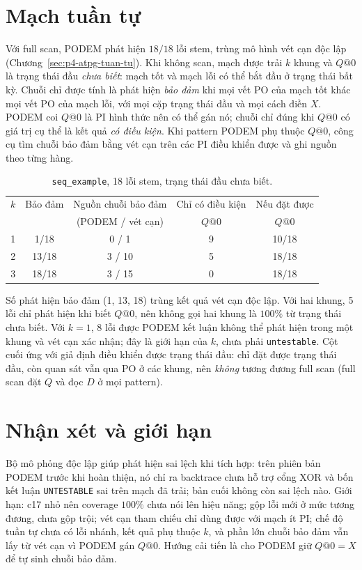 \section{Mạch tuần tự}
\label{sec:p6-tuan-tu}
Với full scan, PODEM phát hiện $18/18$ lỗi stem, trùng mô hình vét cạn độc
lập (Chương~\ref{sec:p4-atpg-tuan-tu}). Khi không scan, mạch được trải $k$ khung và
$Q@0$ là trạng thái đầu \emph{chưa biết}: mạch tốt và mạch lỗi có thể bắt đầu ở
trạng thái bất kỳ. Chuỗi chỉ được tính là phát hiện \emph{bảo đảm} khi mọi vết
PO của mạch tốt khác mọi vết PO của mạch lỗi, với mọi cặp trạng thái đầu và mọi
cách điền $X$. PODEM coi $Q@0$ là PI hình thức nên có thể gán nó; chuỗi chỉ
đúng khi $Q@0$ có giá trị cụ thể là kết quả \emph{có điều kiện}. Khi pattern
PODEM phụ thuộc $Q@0$, công cụ tìm chuỗi bảo đảm bằng vét cạn trên các PI điều
khiển được và ghi nguồn theo từng hàng.
\begin{table}[H]
\centering
\caption{\texttt{seq\_example}, 18 lỗi stem, trạng thái đầu chưa biết.}
\label{tab:p6-seq}
\begin{tabular}{@{}ccccc@{}}
\toprule
$k$ & Bảo đảm & Nguồn chuỗi bảo đảm & Chỉ có điều kiện & Nếu đặt được\\
 & & (PODEM / vét cạn) & $Q@0$ & $Q@0$\\
\midrule
1 & 1/18 & 0 / 1 & 9 & 10/18\\
2 & 13/18 & 3 / 10 & 5 & 18/18\\
3 & 18/18 & 3 / 15 & 0 & 18/18\\
\bottomrule
\end{tabular}
\end{table}
Số phát hiện bảo đảm (1, 13, 18) trùng kết quả vét cạn độc lập. Với hai
khung, 5 lỗi chỉ phát hiện khi biết $Q@0$, nên không gọi hai khung là $100\%$ từ
trạng thái chưa biết. Với $k=1$, 8 lỗi được PODEM kết luận không thể phát hiện
trong một khung và vét cạn xác nhận; đây là giới hạn của $k$, chưa phải
\texttt{untestable}. Cột cuối ứng với giả định điều khiển được trạng thái
đầu: chỉ đặt được trạng thái đầu, còn quan sát vẫn qua PO ở các khung, nên \emph{không}
tương đương full scan (full scan đặt $Q$ và đọc $D$ ở mọi pattern).

\section{Nhận xét và giới hạn}
\label{sec:p6-nhan-xet}
Bộ mô phỏng độc lập giúp phát hiện sai lệch khi tích hợp: trên phiên bản
PODEM trước khi hoàn thiện, nó chỉ ra backtrace chưa hỗ trợ cổng XOR và bốn kết luận
\texttt{UNTESTABLE} sai trên mạch đã trải; bản cuối không còn sai lệch nào.
Giới hạn: c17 nhỏ nên coverage $100\%$ chưa nói lên hiệu năng; gộp lỗi mới ở
mức tương đương, chưa gộp trội; vét cạn tham chiếu chỉ dùng được với mạch ít
PI; chế độ tuần tự chưa có lỗi nhánh, kết quả phụ thuộc $k$, và phần lớn chuỗi
bảo đảm vẫn lấy từ vét cạn vì PODEM gán $Q@0$. Hướng cải tiến là cho PODEM giữ
$Q@0=X$ để tự sinh chuỗi bảo đảm.
